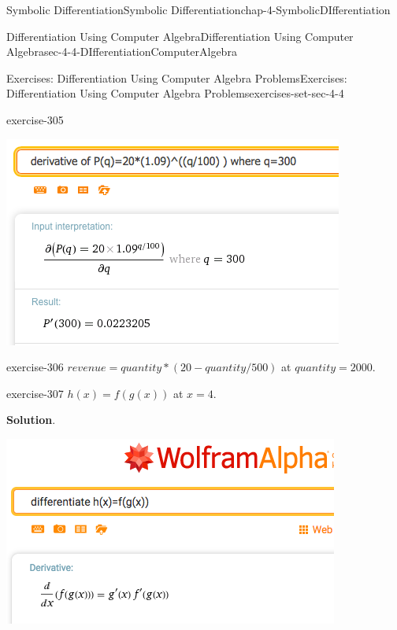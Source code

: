 \documentclass[oneside,10pt,]{book}
\numberwithin{equation}{section}
\begin{document}
\begin{chapterptx}{Symbolic Differentiation}{}{Symbolic Differentiation}{}{}{chap-4-SymbolicDIfferentiation}
\begin{sectionptx}{Differentiation Using Computer Algebra}{}{Differentiation Using Computer Algebra}{}{}{sec-4-4-DIfferentiationComputerAlgebra}
\begin{exercises-subsection-numberless}{Exercises: Differentiation Using Computer Algebra Problems}{}{Exercises: Differentiation Using Computer Algebra Problems}{}{}{exercises-set-sec-4-4}
\begin{divisionexercise}{17}{}{}{exercise-305}
\begin{sidebyside}{1}{0.15}{0.15}{0}
\begin{sbspanel}{0.7}
\includegraphics[width=1\linewidth]{images/sec4-4-sol17a.png}
\end{sbspanel}%
\end{sidebyside}%
\end{divisionexercise}%
\begin{divisionexercise}{18}{}{}{exercise-306}%
\hypertarget{p-1768}{}%
\(revenue=quantity*(20-quantity/500)\) at \(quantity=2000\).%
\end{divisionexercise}%
\begin{divisionexercise}{19}{}{}{exercise-307}%
\hypertarget{p-1769}{}%
\(h(x)=f(g(x))\) at \(x=4\).%
\par\smallskip%
\noindent\textbf{Solution}.\hypertarget{solution-153}{}\quad%
\leavevmode%
\begin{sidebyside}{1}{0.3}{0.3}{0}%
\begin{sbspanel}{0.4}%
\includegraphics[width=1\linewidth]{images/sec4-4-sol19a.png}
\end{sbspanel}%
\end{sidebyside}%
\end{divisionexercise}%

\end{exercises-subsection-numberless}
\end{sectionptx}
\end{chapterptx}
\end{document}
